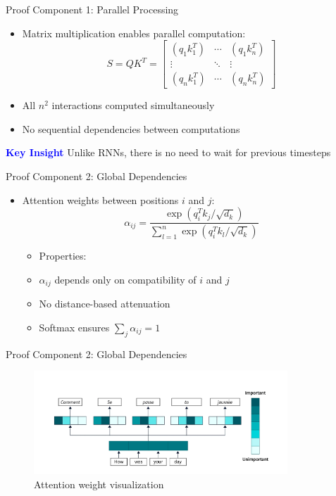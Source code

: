 \documentclass[serif, aspectratio=169]{beamer}
\begin{document}
\begin{frame}{Proof Component 1: Parallel Processing}
    \begin{itemize}
        \item Matrix multiplication enables parallel computation:
        \begin{equation*}
            S = QK^T = \begin{bmatrix}
            (q_1k_1^T) & \cdots & (q_1k_n^T) \\
            \vdots & \ddots & \vdots \\
            (q_nk_1^T) & \cdots & (q_nk_n^T)
            \end{bmatrix}
        \end{equation*}
        \item All $n^2$ interactions computed simultaneously
        \item No sequential dependencies between computations
    \end{itemize}
    \textcolor{blue}{\textbf{Key Insight}}
    \newline
        Unlike RNNs, there is no need to wait for previous timesteps
\end{frame}

\begin{frame}{Proof Component 2: Global Dependencies}
    \begin{itemize}
        \item Attention weights between positions $i$ and $j$:
        \begin{equation*}
            \alpha_{ij} = \frac{\exp(q_i^Tk_j/\sqrt{d_k})}{\sum_{l=1}^n \exp(q_i^Tk_l/\sqrt{d_k})}
        \end{equation*}
        \begin{itemize}
            \item Properties:
            \item $\alpha_{ij}$ depends only on compatibility of $i$ and $j$
            \item No distance-based attenuation
            \item Softmax ensures $\sum_j \alpha_{ij} = 1$
        \end{itemize}
    \end{itemize}
\end{frame}

\begin{frame}{Proof Component 2: Global Dependencies}
        \begin{figure}
        \centering
        \includegraphics[width=0.85\textwidth]{pic/attention-weights.png}
        \caption{Attention weight visualization}
    \end{figure}
\end{frame}
\end{document}
